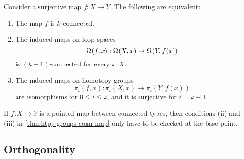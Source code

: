 \begin{thm}
  Consider a surjective map $f:X\to Y$. The following are equivalent:
  \begin{enumerate}
  \item The map $f$ is $k$-connected.
  \item The induced maps on loop spaces
    \begin{equation*}
      \Omega^{}(f,x):\Omega^{}(X,x)\to\Omega^{}(Y,f(x))
    \end{equation*}
    is $(k-1)$-connected for every $x:X$.
  \item The induced maps on homotopy groups
    \begin{equation*}
      \pi_i(f,x):\pi_i(X,x)\to\pi_i(Y,f(x))
    \end{equation*}
    are isomorphisms for $0\leq i\leq k$, and it is surjective for $i=k+1$. 
  \end{enumerate}
\end{thm}

\begin{rmk}
  If $f:X\to Y$ is a pointed map between connected types, then conditions (ii) and (iii) in \cref{thm:htpy-groups-conn-map} only have to be checked at the base point.
\end{rmk}

\subsection{Orthogonality}

